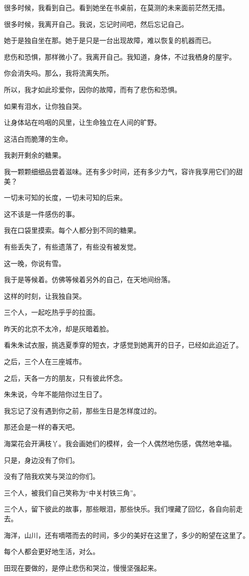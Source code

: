 \documentclass[12pt,a4paper]{article}
\begin{document}
		很多时候，我看到自己。看到她坐在书桌前，在莫测的未来面前茫然无措。\par
		很多时候，我离开自己。我说，忘记时间吧，然后忘记自己。\par
		她于是独自坐在那。她于是只是一台出现故障，难以恢复的机器而已。\par
		悲伤和恐惧，那样微小了。我离开自己。我知道，身体，不过我栖身的屋宇。\par
		你会消失吗。那么，我将流离失所。\par
		所以，我才如此珍爱你，因你的故障，而有了悲伤和恐惧。\par
		如果有泪水，让你独自哭。\par
		让身体站在呜咽的风里，让生命独立在人间的旷野。\par
		这洁白而脆薄的生命。

		我剥开剩余的糖果。\par
		我一颗颗细细品尝着滋味。还有多少时间，还有多少力气，容许我享用它们的甜美？\par
		一切未可知的长度，一切未可知的后来。\par
		这不该是一件感伤的事。\par
		我在口袋里摸索。每个人都分到不同的糖果。\par
		有些丢失了，有些遗落了，有些没有被发觉。

		这一晚，你说有雪。\par
		我于是等候着。仿佛等候着另外的自己，在天地间纷落。

		这样的时刻，让我独自哭。

	\endwriting



		三个人，一起吃热乎乎的拉面。\par
		昨天的北京不太冷，却是灰暗着脸。\par
		看朱朱试衣服，挑选夏季穿的短衣，才感觉到她离开的日子，已经如此迫近了。\par
		之后，三个人在三座城市。\par
		之后，天各一方的朋友，只有彼此怀念。\par
		朱朱说，今年不能陪你过生日了。\par
		我忘记了没有遇到你之前，那些生日是怎样度过的。\par
		那还会是一样的春天吧。\par
		海棠花会开满枝丫。我会画她们的模样，会一个人偶然地伤感，偶然地幸福。\par
		只是，身边没有了你们。\par
		没有了陪我欢笑与哭泣的你们。\par
		三个人，被我们自己笑称为“中关村铁三角”。\par
		三个人，留下彼此的故事，那些眼泪，那些快乐。我们埋藏了回忆，各自向前走去。\par
		海洋，山川，还有嘀嗒而去的时间，多少的美好在这里了，多少的盼望在这里了。\par
		每个人都会更好地生活，对么。\par
		田现在要做的，是停止悲伤和哭泣，慢慢坚强起来。
\end{document}
